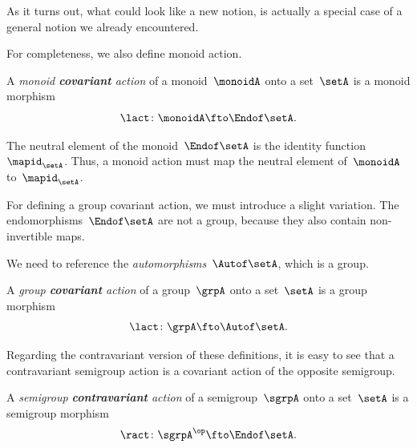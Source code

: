 As it turns out, what could look like a new notion, is actually a special case of a general notion we already encountered.

For completeness, we also define monoid action.

\begin{ctdefinition}\label{def:monoid-cov-action}
  A \emph{monoid \textbf{covariant} action} of a monoid~$\monoidA$ onto a set~$\setA$ is a monoid morphism
  \begin{equation}\label{eq:act-monoid}
    \lact \colon \monoidA \fto \Endof\setA.
  \end{equation}
\end{ctdefinition}

The neutral element of the monoid~$\Endof\setA$ is the identity function~$\mapid_{\setA}$.
Thus, a monoid action must map the neutral element of~$\monoidA$ to~$\mapid_{\setA}$.
%


For defining a group covariant action, we must introduce a slight variation.
The endomorphisms~$\Endof\setA$ are not a group, because they also contain non-invertible maps.

We need to reference the \emph{automorphisms}~$\Autof\setA$, which is a group.

\begin{ctdefinition}\label{def:group-cov-action}
  A \emph{group \textbf{covariant} action} of a group~$\grpA$ onto a set~$\setA$ is a group morphism
  \begin{equation}\label{eq:act-group}
    \lact \colon \grpA \fto \Autof\setA.
  \end{equation}
\end{ctdefinition}

Regarding the contravariant version of these definitions, it is easy to see that a contravariant semigroup action is a covariant action of the opposite semigroup.

\begin{ctdefinition}\label{def:semigroup-cont-action}
  A \emph{semigroup \textbf{contravariant} action} of a semigroup~$\sgrpA$ onto a set~$\setA$ is a semigroup morphism
  \begin{equation}
    \ract \colon \sgrpA^{\op} \fto \Endof\setA.
  \end{equation}
\end{ctdefinition}

